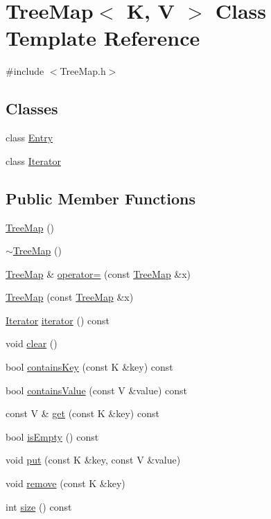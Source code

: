 \hypertarget{class_tree_map}{\section{Tree\-Map$<$ K, V $>$ Class Template Reference}
\label{class_tree_map}
}


{\ttfamily \#include $<$Tree\-Map.\-h$>$}

\subsection*{Classes}
\begin{DoxyCompactItemize}
\item 
class \hyperlink{class_tree_map_1_1_entry}{Entry}
\item 
class \hyperlink{class_tree_map_1_1_iterator}{Iterator}
\end{DoxyCompactItemize}
\subsection*{Public Member Functions}
\begin{DoxyCompactItemize}
\item 
\hyperlink{class_tree_map_a593591d7d7c54568e71718f4c1f18372}{Tree\-Map} ()
\item 
\hyperlink{class_tree_map_a61ade1db7da7e51d738b030d8c877353}{$\sim$\-Tree\-Map} ()
\item 
\hyperlink{class_tree_map}{Tree\-Map} \& \hyperlink{class_tree_map_a21356ebe18e7b16236dd41d50e4f2682}{operator=} (const \hyperlink{class_tree_map}{Tree\-Map} \&x)
\item 
\hyperlink{class_tree_map_a7d383b214da43cac0619faa472e1f719}{Tree\-Map} (const \hyperlink{class_tree_map}{Tree\-Map} \&x)
\item 
\hyperlink{class_tree_map_1_1_iterator}{Iterator} \hyperlink{class_tree_map_abcc2dd91edbd669e3b117700ea1cea47}{iterator} () const 
\item 
void \hyperlink{class_tree_map_a38e2b91c7f411cc38f8f904caaa56f92}{clear} ()
\item 
bool \hyperlink{class_tree_map_a1210e85fda1625a246bd38821234cfc1}{contains\-Key} (const K \&key) const 
\item 
bool \hyperlink{class_tree_map_aff9f0239099fa20f190f9278ec4caf24}{contains\-Value} (const V \&value) const 
\item 
const V \& \hyperlink{class_tree_map_a77456cc28ea659dac453e607874f7981}{get} (const K \&key) const 
\item 
bool \hyperlink{class_tree_map_aaf357ad82338a39c45d02fed5aaa714b}{is\-Empty} () const 
\item 
void \hyperlink{class_tree_map_a825b6036e93a2585fd04f89807356c04}{put} (const K \&key, const V \&value)
\item 
void \hyperlink{class_tree_map_a7978fe6226b466d0b0f382b15f9c2972}{remove} (const K \&key)
\item 
int \hyperlink{class_tree_map_ac8e67b70aca3ce24a9b4a2f27256690a}{size} () const 
\end{DoxyCompactItemize}


